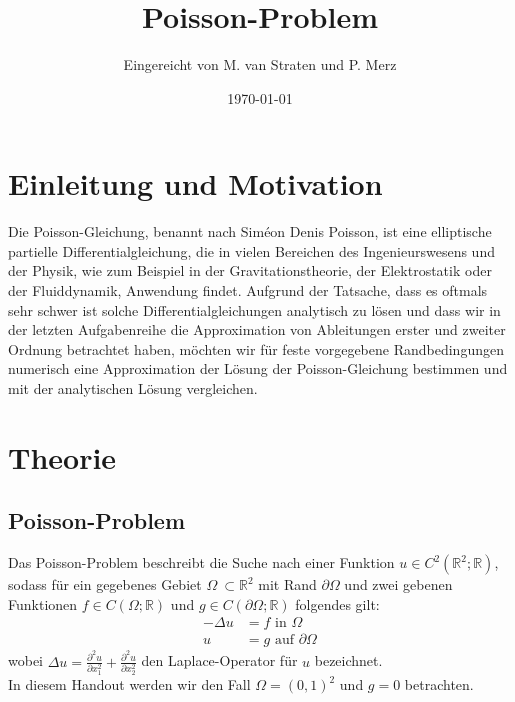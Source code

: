 \documentclass{scrartcl}
\title{Poisson-Problem}
\author{%
  Eingereicht von M. van Straten und P. Merz
}
\date{\today}
\theoremstyle{remark}
\begin{document}
\maketitle
\tableofcontents
\cleardoublepage


\section{Einleitung und Motivation}
Die Poisson-Gleichung, benannt nach Siméon Denis Poisson, ist eine elliptische partielle Differentialgleichung, 
die in vielen Bereichen des Ingenieurswesens und der Physik, wie zum Beispiel in der Gravitationstheorie, der Elektrostatik oder 
der Fluiddynamik, Anwendung findet.\cite{Poisson} Aufgrund der Tatsache, dass es oftmals sehr schwer ist solche Differentialgleichungen analytisch zu lösen
und dass wir in der letzten Aufgabenreihe die Approximation von Ableitungen erster und zweiter Ordnung betrachtet haben, möchten wir für
feste vorgegebene Randbedingungen numerisch eine Approximation der Lösung der Poisson-Gleichung bestimmen und mit der analytischen Lösung
vergleichen.


\section{Theorie}
\subsection{Poisson-Problem} 
Das Poisson-Problem beschreibt die Suche nach einer Funktion \(u \in C^{2}(\mathbb{R}^{2};\mathbb{R})\), sodass für ein gegebenes Gebiet
\(\Omega\ \subset \mathbb{R}^{2}\) mit Rand \(\partial \Omega\) und zwei gebenen Funktionen \(f \in C(\Omega;\mathbb{R})\) und
\(g \in C(\partial \Omega;\mathbb{R})\) folgendes gilt:
\begin{align*}
-\Delta u &= f \text{       in } \Omega  \\
        u &= g \text{       auf } \partial \Omega
\end{align*}
wobei \(\Delta u = \frac{\partial^{2}u}{\partial x_{1}^{2}} + \frac{\partial^{2}u}{\partial x_{2}^{2}}\) den Laplace-Operator für
\(u\) bezeichnet. \cite{PPI_Poisson} \\
In diesem Handout werden wir den Fall \(\Omega = (0, 1)^{2}\) und \(g = 0\) betrachten.
\end{document}
